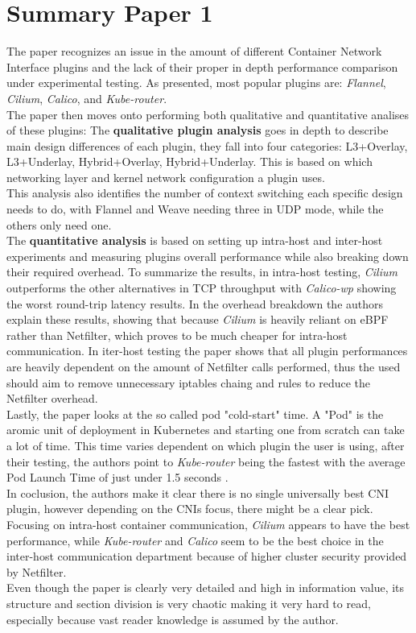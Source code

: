 \section{Summary Paper 1}%
\label{sec:Summary Paper 1}
The paper recognizes an issue in the amount of different Container Network Interface plugins and the lack of their  proper in depth performance comparison under experimental testing.
As presented, most popular plugins are: \textit{Flannel}, \textit{Cilium}, \textit{Calico}, and \textit{Kube-router}.\\
The paper then moves onto performing both qualitative and quantitative analises of these plugins:
The \textbf{qualitative plugin analysis} goes in depth to describe main design differences of each plugin, they fall into four categories: L3+Overlay, L3+Underlay, Hybrid+Overlay, Hybrid+Underlay. This is based on which networking layer and kernel network configuration a plugin uses. \\This analysis also identifies the number of context switching each specific design needs to do, with Flannel and Weave needing three in UDP mode, while the others only need one.\\
The \textbf{quantitative analysis} is based on setting up intra-host and inter-host experiments and measuring plugins overall performance while also breaking down their required overhead. To summarize the results, in intra-host testing, \textit{Cilium} outperforms the other alternatives in TCP throughput with \textit{Calico-wp} showing the worst round-trip latency results. In the overhead breakdown the authors explain these results, showing that because \textit{Cilium} is heavily reliant on eBPF rather than Netfilter, which proves to be much cheaper for intra-host communication. In iter-host testing
the paper shows that all plugin performances are heavily dependent on the amount of Netfilter calls performed, thus the used should aim to remove unnecessary iptables chaing and rules to reduce the Netfilter overhead.\\
Lastly, the paper looks at the so called pod "cold-start" time. A "Pod" is the aromic unit of deployment in Kubernetes \cite{C1} and starting one from scratch can take a lot of time.
This time varies dependent on which plugin the user is using, after their testing, the authors point to \textit{Kube-router} being the fastest with the average Pod Launch Time of just under 1.5 seconds \cite{C1}.\\
In coclusion, the authors make it clear there is no single universally best CNI plugin, however depending on the CNIs focus, there might be a clear pick. Focusing on intra-host container communication, \textit{Cilium} appears to have the best performance, while \textit{Kube-router} and \textit{Calico} seem to be the best choice in the inter-host communication department because of higher cluster security provided by Netfilter.\\Even though the paper is clearly very detailed and high in information value, its structure and section division is very chaotic making it very hard to read, especially because vast reader knowledge is assumed by the author.
